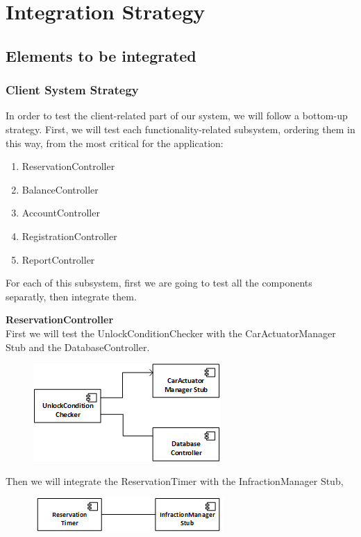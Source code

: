\documentclass{article}
\begin{document}
\section{Integration Strategy}
\subsection{Elements to be integrated}
\subsubsection{Client System Strategy}
In order to test the client-related part of our system, we will follow a bottom-up strategy.
First, we will test each functionality-related subsystem, ordering them in this way, from the most critical for the application:
\begin{enumerate}
\item ReservationController
\item BalanceController
\item AccountController
\item RegistrationController
\item ReportController
\end{enumerate}

For each of this subsystem, first we are going to test all the components separatly, then integrate them.
\newline

\textbf{ReservationController}
\\
First we will test the UnlockConditionChecker with the CarActuatorManager Stub and the DatabaseController.
\\
\begin{figure}[H]
\includegraphics[scale=1]{Images/Reservation/UnlockIntegration.png}
\centering
\end{figure}
Then we will integrate the ReservationTimer with the InfractionManager Stub,
\\
\begin{figure}[H]
\includegraphics[scale=1]{Images/Reservation/TimerIntegration.png}
\centering
\end{figure} 
\end{document}
